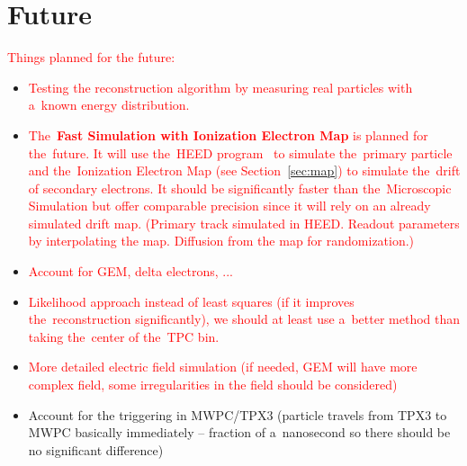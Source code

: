 	\section*{Future}
		\textcolor{red}{Things planned for the future:}
		\begin{itemize}[topsep=4pt,itemsep=2pt]
			\item \textcolor{red}{Testing the reconstruction algorithm by measuring real particles with a~known energy distribution.}
			\item \textcolor{red}{The~\textbf{Fast Simulation with Ionization Electron Map} is planned for the~future. It will use the~\ac{HEED} program~\cite{HEED} to simulate the~primary particle and the~Ionization Electron Map (see Section~\ref{sec:map}) to simulate the~drift of secondary electrons. It should be significantly faster than the~Microscopic Simulation but offer comparable precision since it will rely on an already simulated drift map. (Primary track simulated in HEED. Readout parameters by interpolating the map.	Diffusion from the map for randomization.)}
			\item \textcolor{red}{Account for GEM, delta electrons, ...}
			\item \textcolor{red}{Likelihood approach instead of least squares (if it improves the~reconstruction significantly), we should at least use a~better method than taking the~center of the~TPC bin.}
			\item \textcolor{red}{More detailed electric field simulation (if needed, GEM will have more complex field, some irregularities in the field should be considered)}
			\item Account for the triggering in MWPC/TPX3 (particle travels from TPX3 to MWPC basically immediately -- fraction of a~nanosecond so there should be no significant difference)
		\end{itemize}
		
